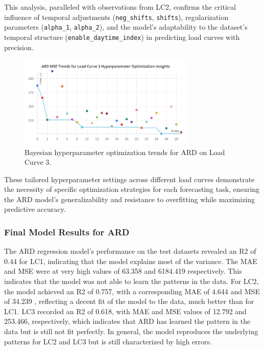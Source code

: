 \documentclass{article} %
\begin{document}
This analysis, paralleled with observations from LC2, confirms the critical influence of temporal adjustments (\texttt{neg\_shifts}, \texttt{shifts}), regularization parameters (\texttt{alpha\_1}, \texttt{alpha\_2}), and the model's adaptability to the dataset's temporal structure (\texttt{enable\_daytime\_index}) in predicting load curves with precision.

\begin{figure}[H]
    \centering
    \includegraphics[width=0.75\textwidth]{ressources/Hyperparams/ard/ARD MSE Trends for Load Curve 3 Hyperparameter Optimization Insights.png}
    \caption{Bayesian hyperparameter optimization trends for ARD on Load Curve 3.}
    \label{fig:ard_lc3}
\end{figure}


These tailored hyperparameter settings across different load curves demonstrate the necessity of specific optimization strategies for each forecasting task, ensuring the \gls*{ARD} model's generalizability and resistance to overfitting while maximizing predictive accuracy.

\subsubsection{Final Model Results for ARD}

The \acrshort{ARD} regression model's performance on the test datasets revealed an \acrshort{R2} of 0.44 for \acrshort{LC1}, indicating that the model explains most of the variance. The \acrshort{MAE} and \acrshort{MSE} were at very high values of 63.358 and 6184.419 respectively. This indicates that the model was not able to learn the patterns in the data. For \acrshort{LC2}, the model achieved an \acrshort{R2} of 0.757, with a corresponding \acrshort{MAE} of 4.644 and \acrshort{MSE} of 34.239 , reflecting a decent fit of the model to the data, much better than for \acrshort{LC1}. \acrshort{LC3} recorded an \acrshort{R2} of 0.618, with \acrshort{MAE} and \acrshort{MSE} values of 12.792 and 253.466, respectively, which indicates that ARD has learned the pattern in the data but is still not fit perfectly. In general, the model reproduces the underlying patterns for LC2 and LC3 but is still characterized by high errors. 
\end{document}

